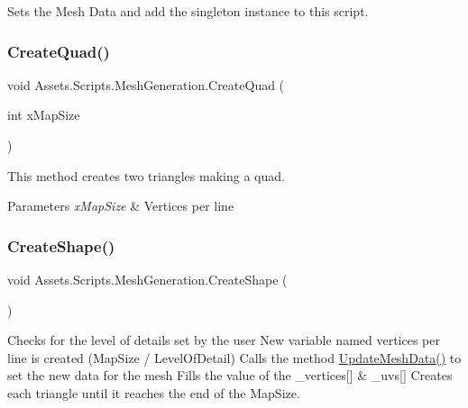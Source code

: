 Sets the Mesh Data and add the singleton instance to this script. 

\mbox{\label{class_assets_1_1_scripts_1_1_mesh_generation_a62d43347495810972a55224a8ff7a7a1}} 
\subsubsection{\texorpdfstring{CreateQuad()}{CreateQuad()}}
{\footnotesize\ttfamily void Assets.\+Scripts.\+Mesh\+Generation.\+Create\+Quad (\begin{DoxyParamCaption}\item[{int}]{x\+Map\+Size }\end{DoxyParamCaption})\hspace{0.3cm}{\ttfamily [private]}}



This method creates two triangles making a quad. 


\begin{DoxyParams}{Parameters}
{\em x\+Map\+Size} & Vertices per line\\
\hline
\end{DoxyParams}
\mbox{\label{class_assets_1_1_scripts_1_1_mesh_generation_aebf4b5f0cb1285927d7c44a03e98d78c}} 
\subsubsection{\texorpdfstring{CreateShape()}{CreateShape()}}
{\footnotesize\ttfamily void Assets.\+Scripts.\+Mesh\+Generation.\+Create\+Shape (\begin{DoxyParamCaption}{ }\end{DoxyParamCaption})}



Checks for the level of details set by the user New variable named vertices per line is created (Map\+Size / Level\+Of\+Detail) Calls the method \mbox{\hyperlink{class_assets_1_1_scripts_1_1_mesh_generation_abaeb22e0f390a218be5d9543138f52b9}{Update\+Mesh\+Data()}} to set the new data for the mesh Fills the value of the \+\_\+vertices\mbox{[}\mbox{]} \& \+\_\+uvs\mbox{[}\mbox{]} Creates each triangle until it reaches the end of the Map\+Size. 

